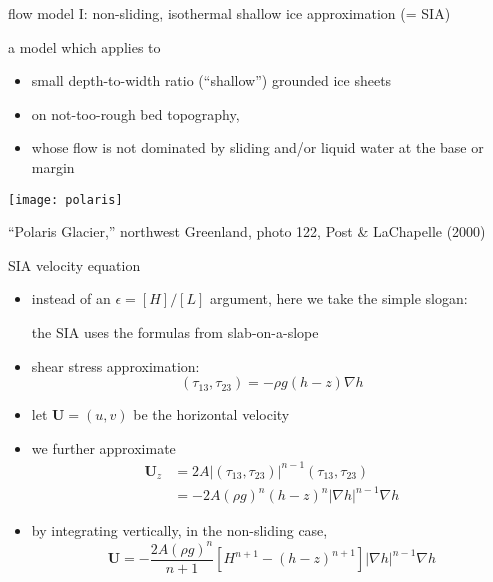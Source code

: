 \begin{frame}{flow model I: non-sliding, isothermal shallow ice approximation (= SIA)}

a model which applies to
\begin{itemize}
\item small depth-to-width ratio (``shallow'') grounded ice sheets
\item on not-too-rough bed topography,
\item whose flow is not dominated by sliding and/or liquid water at the base or margin
\end{itemize}

\begin{center}
  \texttt{[image: polaris]}

\tiny ``Polaris Glacier,'' northwest Greenland, photo 122, Post \& LaChapelle (2000)\nocite{PostLaChapelle}
\end{center}

\end{frame}


\begin{frame}{SIA velocity equation}

\begin{itemize}
\item instead of an $\epsilon = [H]/[L]$ argument, here we take the simple slogan:

\begin{center}
\alert{the SIA uses the formulas from slab-on-a-slope}
\end{center}
\item shear stress approximation:
	$$(\tau_{13},\tau_{23}) = - \rho g (h-z) \nabla h$$
\item let $\mathbf{U} = (u,v)$ be the horizontal velocity
\item we further approximate
\begin{align*}
\mathbf{U}_z &= 2 A |(\tau_{13},\tau_{23})|^{n-1} (\tau_{13},\tau_{23}) \\
     &= - 2 A (\rho g)^n (h-z)^n |\nabla h|^{n-1} \nabla h
\end{align*}
\item by integrating vertically, in the non-sliding case,
    $$\mathbf{U} = - \frac{2 A (\rho g)^n}{n+1} \left[H^{n+1} - (h-z)^{n+1}\right] |\nabla h|^{n-1} \nabla h$$
\end{itemize}
\end{frame}


